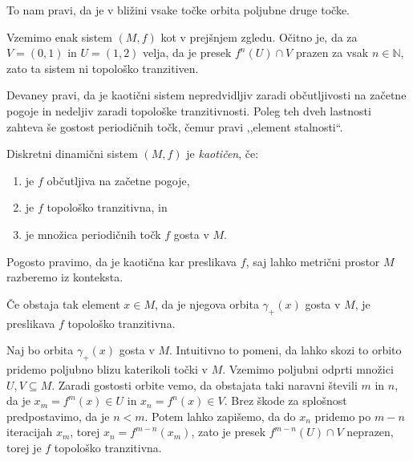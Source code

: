 \documentclass{isrmdelo}
\newcommand{\N}{\mathbb N}
\newcommand{\narekovaji}[1]{,,#1``}
\begin{document}
To nam pravi, da je v bližini vsake točke orbita poljubne druge točke.

\begin{zgled}
Vzemimo enak sistem $(M, f)$ kot v prejšnjem zgledu. Očitno je, da za $V = (0, 1)$ in $U = (1, 2)$ velja, da je presek $f^{n}(U) \cap V$ prazen za vsak $n \in \N$, zato ta sistem ni topološko tranzitiven.
\end{zgled}

\medskip

Devaney pravi, da je kaotični sistem nepredvidljiv zaradi občutljivosti na začetne pogoje in nedeljiv zaradi topološke tranzitivnosti. Poleg teh dveh lastnosti zahteva še gostost periodičnih točk, čemur pravi \narekovaji{element stalnosti}.
\begin{definicija}
Diskretni dinamični sistem $(M, f)$ je \emph{kaotičen}, če:
\begin{enumerate}
\item je $f$ občutljiva na začetne pogoje,
\item je $f$ topološko tranzitivna, in
\item je množica periodičnih točk $f$ gosta v $M$.
\end{enumerate}
\end{definicija}

\begin{opomba}
Pogosto pravimo, da je kaotična kar preslikava $f$, saj lahko metrični prostor $M$ razberemo iz konteksta.
\end{opomba}

\medskip

\begin{trditev}
\label{trditev:gosta_orbita}
Če obstaja tak element $x \in M$, da je njegova orbita $\gamma_{+}(x)$ gosta v $M$, je preslikava $f$ topološko tranzitivna.
\end{trditev}

\begin{dokaz}
Naj bo orbita $\gamma_+(x)$ gosta v $M$. Intuitivno to pomeni, da lahko skozi to orbito pridemo poljubno blizu katerikoli točki v $M$. Vzemimo poljubni odprti množici $U, V \subseteq M$. Zaradi gostosti orbite vemo, da obstajata taki naravni števili $m$ in $n$, da je $x_m = f^m(x) \in U$ in $x_n = f^n(x) \in V$. Brez škode za splošnost predpostavimo, da je $n < m$. Potem lahko zapišemo, da do $x_n$ pridemo po $m-n$ iteracijah $x_m$, torej $x_n = f^{m-n}(x_m)$, zato je presek $f^{m-n}(U) \cap V$ neprazen, torej je $f$ topološko tranzitivna. \qedhere
\end{dokaz}
\end{document}
